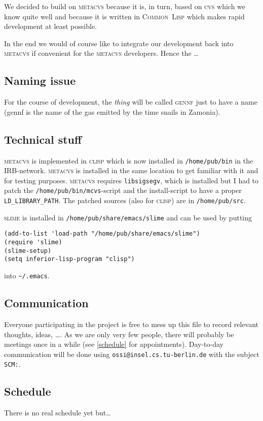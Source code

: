 \documentclass[german, 10pt, a4paper]{article}
\begin{document}
We decided to build on \textsc{metacvs} because it is, in turn, based on
\textsc{cvs} which we know quite well and because it is written in
\textsc{Common~Lisp} which makes rapid development at least possible.

In the end we would of course like to integrate our development back
into \textsc{metacvs} if convenient for the \textsc{metacvs} developers.
Hence the \ldots

\subsection{Naming issue}
For the course of development, the \emph{thing} will be called
\textsc{gennf} just to have a name (gennf is the name of the gas emitted
by the time snails in Zamonia).

\subsection{Technical stuff}
\textsc{metacvs} is implemented in \textsc{clisp} which is now installed
in \texttt{/home/pub/bin} in the IRB-network. \textsc{metacvs} is
installed in the same location to get familiar with it and for testing
purposes. \textsc{metacvs} requires \texttt{libsigsegv}, which is
installed but I had to patch the \texttt{/home/pub/bin/mcvs}-script and
the install-script to have a proper \texttt{LD\_LIBRARY\_PATH}. The
patched sources (also for \textsc{clisp}) are in \texttt{/home/pub/src}.

\textsc{slime} is installed in \texttt{/home/pub/share/emacs/slime} and
can be used by putting
\begin{verbatim}
(add-to-list 'load-path "/home/pub/share/emacs/slime")
(require 'slime)
(slime-setup)
(setq inferior-lisp-program "clisp")
\end{verbatim}

into \texttt{\textasciitilde/.emacs}.

\subsection{Communication}
Everyone participating in the project is free to mess up this file to
record relevant thoughts, ideas, \ldots.
As we are only very few people, there will probably be meetings once in
a while (see \ref{schedule} for appointments).
Day-to-day communication will be done using
\texttt{ossi@insel.cs.tu-berlin.de} with the subject \texttt{SCM:}.
\subsection{Schedule \label{schedule}}
There is no real schedule yet but\ldots
\end{document}
